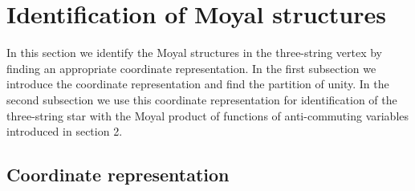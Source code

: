 \documentclass[a4paper,12pt]{article}
\begin{document}
\section{Identification of Moyal structures}
\label{sec:mpiden}
\setcounter{equation}{0}

In this section we identify the Moyal structures in the
three-string vertex by finding an appropriate coordinate representation.
In the first subsection we introduce the coordinate representation
and find the partition of unity.
In the second subsection we use this coordinate representation
for identification of the three-string star with the Moyal product
of functions of anti-commuting variables introduced in section 2.


\subsection{Coordinate representation}
\end{document}
